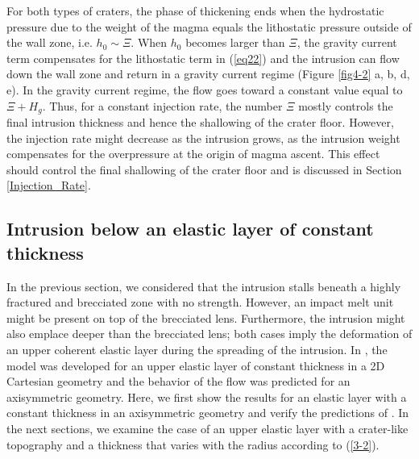 \begin{article}
        For both types  of craters, the phase of  thickening ends when
        the hydrostatic pressure due to the weight of the magma equals
        the  lithostatic  pressure  outside  of the  wall  zone,  i.e.
        $h_{0} \sim \Xi$. When $h_{0} $ becomes larger than $\Xi$, the
        gravity current  term compensates for the  lithostatic term in
        (\ref{eq22}) and the intrusion can flow down the wall zone and
        return in a gravity current  regime (Figure \ref{fig4-2} a, b,
        d, e). In  the gravity current regime, the flow  goes toward a
        constant  value equal  to $\Xi  + H_g$.  Thus, for  a constant
        injection  rate, the  number $\Xi$  mostly controls  the final
        intrusion  thickness and  hence the  shallowing of  the crater
        floor.  However,  the injection  rate  might  decrease as  the
        intrusion grows,  as the intrusion weight  compensates for the
        overpressure at the origin of magma ascent. This effect should
        control  the  final shallowing  of  the  crater floor  and  is
        discussed in Section \ref{Injection_Rate}.
	
	
\subsection{Intrusion below  an elastic layer
            of constant thickness}
        \label{Constant_Thickness}
		
        In  the previous  section,  we considered  that the  intrusion
        stalls beneath a highly fractured  and brecciated zone with no
        strength. However, an impact melt unit might be present on top
        of the brecciated lens.  Furthermore, the intrusion might also
        emplace deeper than the brecciated  lens; both cases imply the
        deformation  of an  upper  coherent elastic  layer during  the
        spreading of the intrusion.  In \citet{Michaut2011}, the model
        was developed for an upper elastic layer of constant thickness
        in a  2D Cartesian geometry and  the behavior of the  flow was
        predicted for  an axisymmetric  geometry. Here, we  first show
        the results for an elastic  layer with a constant thickness in
        an  axisymmetric  geometry  and   verify  the  predictions  of
        \citet{Michaut2011}. In the next sections, we examine the case
        of an upper elastic layer  with a crater-like topography and a
        thickness   that  varies   with   the   radius  according   to
        (\ref{3-2}).


\end{article}
